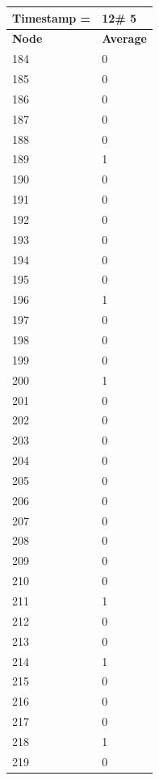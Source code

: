 \begin{tabular}{|l||l|}
\hline
\textbf{Timestamp =} & \textbf{12}\# 5\\\hline
	\textbf{Node} & \textbf{Average} \\ \hline
\hline
	184 & 0 \\ \hline
	185 & 0 \\ \hline
	186 & 0 \\ \hline
	187 & 0 \\ \hline
	188 & 0 \\ \hline
	189 & 1 \\ \hline
	190 & 0 \\ \hline
	191 & 0 \\ \hline
	192 & 0 \\ \hline
	193 & 0 \\ \hline
	194 & 0 \\ \hline
	195 & 0 \\ \hline
	196 & 1 \\ \hline
	197 & 0 \\ \hline
	198 & 0 \\ \hline
	199 & 0 \\ \hline
	200 & 1 \\ \hline
	201 & 0 \\ \hline
	202 & 0 \\ \hline
	203 & 0 \\ \hline
	204 & 0 \\ \hline
	205 & 0 \\ \hline
	206 & 0 \\ \hline
	207 & 0 \\ \hline
	208 & 0 \\ \hline
	209 & 0 \\ \hline
	210 & 0 \\ \hline
	211 & 1 \\ \hline
	212 & 0 \\ \hline
	213 & 0 \\ \hline
	214 & 1 \\ \hline
	215 & 0 \\ \hline
	216 & 0 \\ \hline
	217 & 0 \\ \hline
	218 & 1 \\ \hline
	219 & 0 \\ \hline
\end{tabular}

